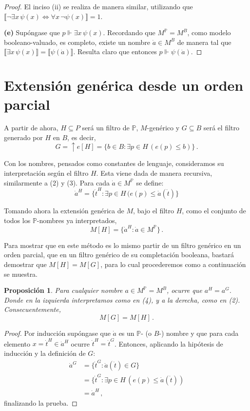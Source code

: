 \documentclass[letterpaper,DIV=15,12pt]{scrartcl}
\newtheorem{proposicion}{Proposición}
\newcommand{\tq}{:}
\newcommand{\Bv}[1]{\llbracket #1 \rrbracket}
\begin{document}
\begin{proof}
        El inciso (ii) se realiza de manera similar, utilizando que $\Bv{\lnot \exists x \, \psi(x) \Leftrightarrow \forall x \, \lnot \psi(x)}=1$.

        \textbf{(e)} Supóngase que $p \Vdash \exists x \, \psi(x)$. Recordando que $M^\mathbb{P}=M^B$, como modelo booleano-valuado, es completo, existe un nombre $\dot{a} \in M^B$ de manera tal que $\Bv{\exists x \, \psi(x)}=\Bv{\psi(\dot{a})}$. Resulta claro que entonces $p \Vdash \psi(\dot{a})$.
    \end{proof}

    \section*{Extensión genérica desde un orden parcial}

    A partir de ahora, $H \subseteq P$ será un filtro de $\mathbb{P}$, $M$-genérico y $G \subseteq B$ será el filtro generado por $H$ en $B$, es decir,
     \[ G=\uparrow e[H] = \{ b \in B \tq \exists p \in H \, ( e(p) \leq b) \} \, . \]

    Con los nombres, pensados como constantes de lenguaje, consideramos su interpretación según el filtro $H$. Esta viene dada de manera recursiva, similarmente a (2) y (3). Para cada $\dot{a} \in M^{\mathbb{P}}$ se define:
    \begin{equation}
        \dot{a}^H = \{ \dot{t}^H \tq \exists p \in H \, (e(p) \leq \dot{a}(\dot{t} ) \}
    \end{equation}

    Tomando ahora la extensión genérica de $M$, bajo el filtro $H$, como el conjunto de todos los $\mathbb{P}$-nombres ya interpretados,
        \begin{equation}
            M[H] = \{ \dot{a}^H \tq \dot{a} \in M^{\mathbb{P}} \}  \, .
        \end{equation}

    Para mostrar que en este método es lo mismo partir de un filtro genérico en un orden parcial, que en un filtro genérico de su completación booleana, bastará demostrar que $M[H]=M[G]$, para lo cual procederemos como a continuación se muestra.

    \begin{proposicion}
        Para cualquier nombre $a \in M^\mathbb{P} = M^B$, ocurre que $a^H = a^G$. Donde en la izquierda interpretamos como en (4), y a la derecha, como en (2). Consecuentemente,
        \[ M[G] = M[H] \, . \]
    \end{proposicion}
    \begin{proof}
        Por inducción supóngase que $\dot{a}$ es un $\mathbb{P}$- (o $B$-) nombre y que para cada elemento $x=\dot{t}^H \in \dot{a}^H$ ocurre $\dot{t}^H=\dot{t}^G$. Entonces, aplicando la hipótesis de inducción y la definición de $G$:
        \begin{align*}
            \dot{a}^G & = \{ \dot{t}^G \tq \dot{a}(\dot{t}) \in G \} \\
            & = \{ \dot{t}^G \tq \exists p \in H \, (e(p) \leq \dot{a}(\dot{t})) \\
            & = \dot{a}^H \, ,
        \end{align*}
        finalizando la prueba.
    \end{proof}
\end{document}
